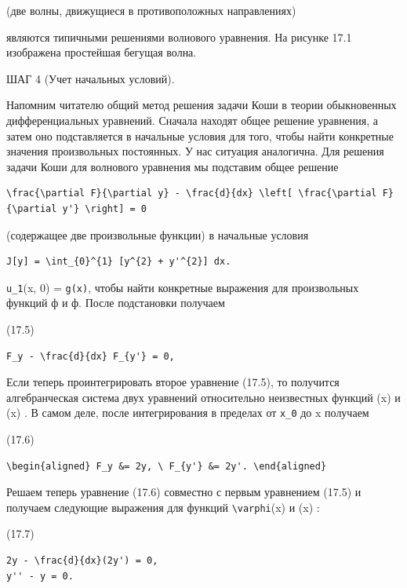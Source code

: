 \documentclass[
  ukrainian,
]{article}
\begin{document}
(две волны, движущиеся в противоположных направлениях)

являются типичными решениями волиового уравнения. На рисунке 17.1
изображена простейшая бегущая волна.

ШАГ 4 (Учет начальных условий).

Напомним читателю общий метод решения задачи Коши в теории обыкновенных
дифференциальных уравнений. Сначала находят общее решение уравнения, а
затем оно подставляется в начальные условия для того, чтобы найти
конкретные значения произвольных постоянных. У нас ситуация аналогична.
Для решения задачи Коши для волнового уравнения мы подставим общее
решение

\begin{verbatim}
\frac{\partial F}{\partial y} - \frac{d}{dx} \left[ \frac{\partial F}{\partial y'} \right] = 0
\end{verbatim}

(содержащее две произвольные функции) в начальные условия

\begin{verbatim}
J[y] = \int_{0}^{1} [y^{2} + y'^{2}] dx.
\end{verbatim}

\texttt{u\_1}(x, 0) = \texttt{g(x)}, чтобы найти конкретные выражения
для произвольных функций ф и ф. После подстановки получаем

(17.5)

\begin{verbatim}
F_y - \frac{d}{dx} F_{y'} = 0,
\end{verbatim}

Если теперь проинтегрировать второе уравнение (17.5), то получится
алгебранческая система двух уравнений относительно неизвестных функций
\varphi(x) и \psi(x) . В самом деле, после интегрирования в пределах от
\texttt{x\_0} до x получаем

(17.6)

\begin{verbatim}
\begin{aligned} F_y &= 2y, \ F_{y'} &= 2y'. \end{aligned}
\end{verbatim}

Решаем теперь уравнение (17.6) совместно с первым уравнением (17.5) и
получаем следующие выражения для функций
\texttt{\textbackslash{}varphi}(x) и \psi(x) :

(17.7)

\begin{verbatim}
2y - \frac{d}{dx}(2y') = 0,
y'' - y = 0.
\end{verbatim}
\end{document}
